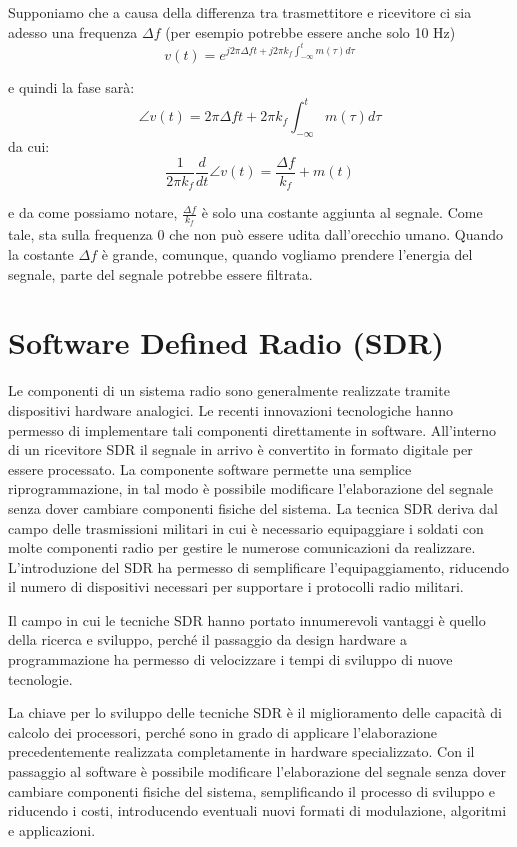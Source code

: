 \begin{center}
    
\end{center}


Supponiamo che a causa della differenza tra trasmettitore e ricevitore ci sia adesso una frequenza $\Delta f$ (per esempio potrebbe essere anche solo 10 Hz)
\[
    v(t) = e^{j2\pi \Delta f t + j2 \pi k_f \int_{-\infty}^{t} m(\tau) d\tau}
\]

e quindi la fase sarà:
\[
    \angle v(t) = 2\pi \Delta f t + 2\pi k_f \int_{-\infty}^{t} m(\tau) d\tau
\]
da cui:
\[
    \frac{1}{2\pi k_f}  \frac{d}{dt} \angle v(t) = \frac{\Delta f}{k_f} + m(t)
\]

e da come possiamo notare, $\frac{\Delta f}{k_f}$ è solo una costante aggiunta al segnale. Come tale, sta sulla frequenza 0 che non può essere udita dall'orecchio umano. Quando la costante $\Delta f$ è grande, comunque, quando vogliamo prendere l'energia del segnale, parte del segnale potrebbe essere filtrata.%


\section*{Software Defined Radio (SDR)}
Le componenti di un sistema radio sono generalmente realizzate tramite dispositivi hardware analogici.
Le recenti innovazioni tecnologiche hanno permesso di implementare tali componenti direttamente in software.
All'interno di un ricevitore SDR il segnale in arrivo è convertito in formato digitale per essere processato.
La componente software permette una semplice riprogrammazione, in tal modo è possibile modificare l'elaborazione del segnale senza dover cambiare componenti fisiche del sistema.
La tecnica SDR deriva dal campo delle trasmissioni militari in cui è necessario equipaggiare i soldati con molte componenti radio per gestire le numerose comunicazioni da realizzare.
L'introduzione del SDR ha permesso di semplificare l'equipaggiamento, riducendo il numero di dispositivi necessari per supportare i protocolli radio militari.

Il campo in cui le tecniche SDR hanno portato innumerevoli vantaggi è quello della ricerca e sviluppo, perché il passaggio da design hardware a programmazione ha permesso di velocizzare i tempi di sviluppo di nuove tecnologie.

La chiave per lo sviluppo delle tecniche SDR è il miglioramento delle capacità di calcolo dei processori, perché sono in grado di applicare l'elaborazione precedentemente realizzata completamente in hardware specializzato.
Con il passaggio al software è possibile modificare l'elaborazione del segnale senza dover cambiare componenti fisiche del sistema, semplificando il processo di sviluppo e riducendo i costi, introducendo eventuali nuovi formati di modulazione, algoritmi e applicazioni.


